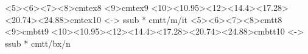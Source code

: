 %
%
\makeatletter
{}%
  {%
   \newcommand\SkipToFmtEnd{}%
   \newcommand\EndFmtInput{}%
   \long\def\SkipToFmtEnd#1\EndFmtInput{}%
  }\SkipToFmtEnd

\newcommand\ReadOnlyOnce[1]{\@ifundefined{#1}{\@namedef{#1}{}}\SkipToFmtEnd}
  {<5><6><7><8>cmtex8
   <9>cmtex9
   <10><10.95><12><14.4><17.28><20.74><24.88>cmtex10}{}
  {<-> ssub * cmtt/m/it}{}
\newcommand{\texfamily}{\fontfamily{cmtex}\selectfont}
  {<5><6><7><8>cmtt8
   <9>cmbtt9
   <10><10.95><12><14.4><17.28><20.74><24.88>cmbtt10}{}
  {<-> ssub * cmtt/bx/n}{}
\newcommand{\tex}[1]{\text{\texfamily#1}}	%

\newcommand{\Sp}{\hskip.33334em\relax}


\newcommand{\Conid}[1]{\mathit{#1}}
\newcommand{\Varid}[1]{\mathit{#1}}
\newcommand{\anonymous}{\kern0.06em \vbox{\hrule\@width.5em}}
\newcommand{\plus}{\mathbin{+\!\!\!+}}
\newcommand{\bind}{\mathbin{>\!\!\!>\mkern-6.7mu=}}
\newcommand{\rbind}{\mathbin{=\mkern-6.7mu<\!\!\!<}}%
\newcommand{\sequ}{\mathbin{>\!\!\!>}}
\renewcommand{\leq}{\leqslant}
\renewcommand{\geq}{\geqslant}

%
  {\newdimen\mathindent\mathindent\leftmargini}%
  {}%

\def\resethooks{%
  \global\let\SaveRestoreHook\empty
  \global\let\ColumnHook\empty}
\newcommand*{\savecolumns}[1][default]%
  {\g@addto@macro\SaveRestoreHook{\savecolumns[#1]}}
\newcommand*{\restorecolumns}[1][default]%
  {\g@addto@macro\SaveRestoreHook{\restorecolumns[#1]}}
\newcommand*{\aligncolumn}[2]%
  {\g@addto@macro\ColumnHook{\column{#1}{#2}}}

\resethooks

\newcommand{\onelinecommentchars}{\quad-{}- }
\newcommand{\commentbeginchars}{\enskip\{-}
\newcommand{\commentendchars}{-\}\enskip}

\newcommand{\visiblecomments}{%
  \let\onelinecomment=\onelinecommentchars
  \let\commentbegin=\commentbeginchars
  \let\commentend=\commentendchars}

\newcommand{\invisiblecomments}{%
  \let\onelinecomment=\empty
  \let\commentbegin=\empty
  \let\commentend=\empty}

